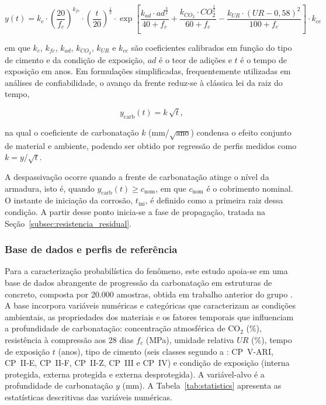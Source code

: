 \begin{equation}\label{eq:y}
y(t) = k_c \cdot \left( \frac{20}{f_c} \right)^{k_{fc}} \cdot \left( \frac{t}{20} \right)^{\frac{1}{2}} \cdot \exp \left[ \frac{k_{ad} \cdot ad^{\frac{3}{2}}}{40 + f_c} + \frac{k_{CO_2} \cdot CO_2^{\frac{1}{2}}}{60 + f_c} - \frac{k_{UR} \cdot (UR - 0{,}58)^2}{100 + f_c} \right] \cdot k_{ce}
\end{equation}

\noindent em que $k_c$, $k_{fc}$, $k_{ad}$, $k_{CO_2}$, $k_{UR}$ e $k_{ce}$ são coeficientes calibrados em função do tipo de cimento e da condição de exposição, $ad$ é o teor de adições e $t$ é o tempo de exposição em anos. Em formulações simplificadas, frequentemente utilizadas em análises de confiabilidade, o avanço da frente reduz-se à clássica lei da raiz do tempo,

\begin{equation}\label{eq:raiz_t}
y_{\mathrm{carb}}(t) = k\,\sqrt{t},
\end{equation}

\noindent na qual o coeficiente de carbonatação $k$ (mm/$\sqrt{\text{ano}}$) condensa o efeito conjunto de material e ambiente, podendo ser obtido por regressão de perfis medidos como $k = y/\sqrt{t}$.

A despassivação ocorre quando a frente de carbonatação atinge o nível da armadura, isto é, quando $y_{\mathrm{carb}}(t) \geq c_{\mathrm{nom}}$, em que $c_{\mathrm{nom}}$ é o cobrimento nominal. O instante de iniciação da corrosão, $t_{\mathrm{ini}}$, é definido como a primeira raiz dessa condição. A partir desse ponto inicia-se a fase de propagação, tratada na Seção~\ref{subsec:resistencia_residual}.

\subsubsection{Base de dados e perfis de refer\^encia}
\label{subsec:dataset}

Para a caracterização probabilística do fenômeno, este estudo apoia-se em uma base de dados abrangente de progressão da carbonatação em estruturas de concreto, composta por 20.000 amostras, obtida em trabalho anterior do grupo \parencite{couto2025}. A base incorpora variáveis numéricas e categóricas que caracterizam as condições ambientais, as propriedades dos materiais e os fatores temporais que influenciam a profundidade de carbonatação: concentração atmosférica de CO$_2$ (\%), resistência à compressão aos 28 dias $f_c$ (MPa), umidade relativa $UR$ (\%), tempo de exposição $t$ (anos), tipo de cimento (seis classes segundo a \textcite{nbr16697}: CP~V-ARI, CP~II-E, CP~II-F, CP~II-Z, CP~III e CP~IV) e condição de exposição (interna protegida, externa protegida e externa desprotegida). A variável-alvo é a profundidade de carbonatação $y$ (mm). A Tabela~\ref{tab:statistics} apresenta as estatísticas descritivas das variáveis numéricas.

